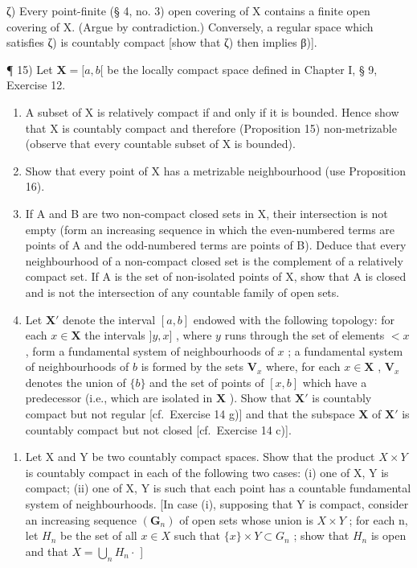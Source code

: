 ζ) Every point-finite (§ 4, no. 3) open covering of X contains a finite open covering of X. (Argue by contradiction.) Conversely, a regular space which satisfies ζ) is countably compact {[}show that ζ) then implies β){]}.

¶ 15) Let \(\mathbf{X} = [a, b[\) be the locally compact space defined in Chapter I, § 9, Exercise 12.

\begin{enumerate}
\def\labelenumi{\alph{enumi})}
\item
  A subset of X is relatively compact if and only if it is bounded. Hence show that X is countably compact and therefore (Proposition 15) non-metrizable (observe that every countable subset of X is bounded).
\item
  Show that every point of X has a metrizable neighbourhood (use Proposition 16).
\item
  If A and B are two non-compact closed sets in X, their intersection is not empty (form an increasing sequence in which the even-numbered terms are points of A and the odd-numbered terms are points of B). Deduce that every neighbourhood of a non-compact closed set is the complement of a relatively compact set. If A is the set of non-isolated points of X, show that A is closed and is not the intersection of any countable family of open sets.
\item
  Let \(\mathbf{X}'\) denote the interval \([a, b]\) endowed with the following topology: for each \(x \in \mathbf{X}\) the intervals \(]y, x]\) , where \(y\) runs through the set of elements \(< x\) , form a fundamental system of neighbourhoods of \(x\) ; a fundamental system of neighbourhoods of \(b\) is formed by the sets \(\mathbf{V}_x\) where, for each \(x \in \mathbf{X}\) , \(\mathbf{V}_x\) denotes the union of \(\{b\}\) and the set of points of \([x, b]\) which have a predecessor (i.e., which are isolated in \(\mathbf{X}\) ). Show that \(\mathbf{X}'\) is countably compact but not regular {[}cf.~Exercise 14 g){]} and that the subspace \(\mathbf{X}\) of \(\mathbf{X}'\) is countably compact but not closed {[}cf.~Exercise 14 c){]}.
\end{enumerate}

\begin{enumerate}
\def\labelenumi{\arabic{enumi})}
\setcounter{enumi}{15}
\tightlist
\item
  Let X and Y be two countably compact spaces. Show that the product \(X \times Y\) is countably compact in each of the following two cases: (i) one of X, Y is compact; (ii) one of X, Y is such that each point has a countable fundamental system of neighbourhoods. {[}In case (i), supposing that Y is compact, consider an increasing sequence \((\mathbf{G}_{n})\) of open sets whose union is \(X \times Y\) ; for each n, let \(H_{n}\) be the set of all \(x \in X\) such that \(\{x\} \times Y \subset G_{n}\) ; show that \(H_{n}\) is open and that \(X = \bigcup_{n} H_{n} \cdot\) {]}
\end{enumerate}

